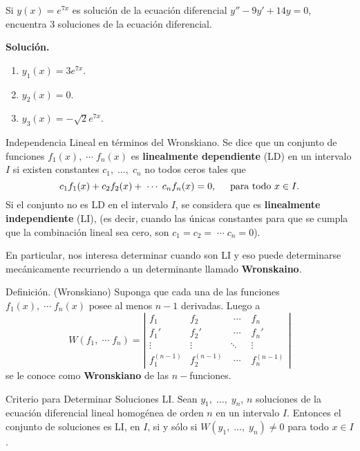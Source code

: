 \documentclass{beamer}
\begin{document}
\begin{frame}[t]
	\begin{example}
		Si \(y(x) = e^{7x}\) es solución de la ecuación diferencial \(y'' -9y' +14y=0\), encuentra 3 soluciones de la ecuación diferencial.
	\end{example}
	\begin{exampleblock}{}
		\textbf{Solución.} 
		\begin{enumerate}
			\item \(y_1(x) = 3e^{7x}\).
			\item \(y_2(x) = 0\).
			\item \(y_3(x) = - \sqrt{2} e^{7x}\).
		\end{enumerate}
	\end{exampleblock}
\end{frame}

\begin{frame}[t]
	\begin{block}{Independencia Lineal en términos del Wronskiano.}
		Se dice que un conjunto de funciones \(f_1(x) , \;\cdots\; f_n(x)\) es \textbf{linealmente dependiente} (LD) en un intervalo \(I\) si existen constantes \(c_1, \;\ldots,\; c_n\) no todos ceros tales que
		\[
			c_1f_1(x) + c_2f_2(x) + \;\cdots\; c_nf_n(x) =0, \hspace{5mm} \mbox{para todo } x \in I.
		\]
		Si el conjunto no es LD en el intervalo \(I\), se considera que es \textbf{linealmente independiente} (LI), (es decir, cuando las únicas constantes para que se cumpla que la combinación lineal sea cero, son \(c_1=c_2= \;\cdots\; c_n=0\)).
	\end{block} 
	En particular, nos interesa determinar cuando son LI y eso puede determinarse mecánicamente recurriendo a un determinante llamado \textbf{Wronskaino}.
\end{frame}

\begin{frame}[t]
	\begin{block}{Definición. (Wronskiano)}
		Suponga que cada una de las funciones \(f_1(x) , \;\cdots\; f_n(x)\) posee al menos \(n-1\) derivadas. Luego a
		\[
			W(f_1, \;\cdots\; f_n) = \left| \begin{array}{llll}
				f_1 				& f_2 				& \;\cdots\;  				& f_n\\[2mm]
				f_1' 				& f_2' 				& \;\cdots\;  				& f_n'\\[2mm]
				\vdots & \vdots & \ddots & \vdots \\[2mm]
				f^{(n-1)}_1 				& f^{(n-1)}_2 				& \;\cdots\;  				& f^{(n-1)}_n
			\end{array}\right| 
		\]
		se le conoce como \textbf{Wronskiano} de las \(n-\)funciones.
	\end{block} 
	\begin{block}{Criterio para Determinar Soluciones LI.}
		Sean \(y_1, \;\ldots,\; y_n\), \(n\) soluciones de la ecuación diferencial lineal homogénea de orden \(n\) en un intervalo \(I\). Entonces el conjunto de soluciones es LI, en \(I\), si y sólo si \(W(y_1, \;\ldots,\; y_n) \ne 0\) para todo \(x \in I\).
	\end{block}
\end{frame}
\end{document}
